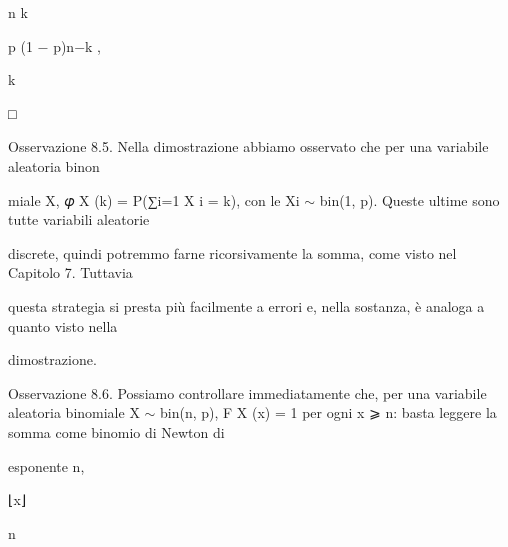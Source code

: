 \documentclass[a4paper,portrait,12pt]{article}
\begin{document}
\begin{flushleft}
n k
\end{flushleft}


\begin{flushleft}
p (1 $-$ p)n$-$k ,
\end{flushleft}


\begin{flushleft}
k
\end{flushleft}


□





\begin{flushleft}
Osservazione 8.5. Nella dimostrazione abbiamo osservato che per una variabile aleatoria binon
\end{flushleft}


\begin{flushleft}
miale X, 𝜑 X (k) = P(∑i=1 X i = k), con le Xi $\sim$ bin(1, p). Queste ultime sono tutte variabili aleatorie
\end{flushleft}


\begin{flushleft}
discrete, quindi potremmo farne ricorsivamente la somma, come visto nel Capitolo 7. Tuttavia
\end{flushleft}


\begin{flushleft}
questa strategia si presta più facilmente a errori e, nella sostanza, \`{e} analoga a quanto visto nella
\end{flushleft}


\begin{flushleft}
dimostrazione.
\end{flushleft}


\begin{flushleft}
Osservazione 8.6. Possiamo controllare immediatamente che, per una variabile aleatoria binomiale X $\sim$ bin(n, p), F X (x) = 1 per ogni x ⩾ n: basta leggere la somma come binomio di Newton di
\end{flushleft}


\begin{flushleft}
esponente n,
\end{flushleft}


\begin{flushleft}
⌊x⌋
\end{flushleft}


\begin{flushleft}
n
\end{flushleft}
\end{document}

